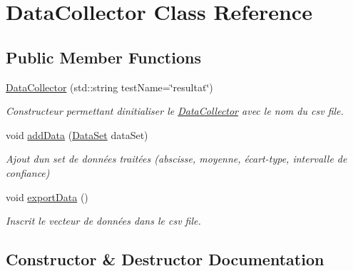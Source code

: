 \hypertarget{classDataCollector}{}\section{Data\+Collector Class Reference}
\label{classDataCollector}
\subsection*{Public Member Functions}
\begin{DoxyCompactItemize}
\item 
\hyperlink{classDataCollector_a8061e46d6301b7a766bd628472353b44}{Data\+Collector} (std\+::string test\+Name=\char`\"{}resultat\char`\"{})
\begin{DoxyCompactList}\small\item\em Constructeur permettant d\textquotesingle{}initialiser le \hyperlink{classDataCollector}{Data\+Collector} avec le nom du csv file. \end{DoxyCompactList}\item 
\mbox{\label{classDataCollector_ac0d50d38e3a5107541f929d4ea3a8cb5}} 
void \hyperlink{classDataCollector_ac0d50d38e3a5107541f929d4ea3a8cb5}{add\+Data} (\hyperlink{classDataSet}{Data\+Set} data\+Set)
\begin{DoxyCompactList}\small\item\em Ajout d\textquotesingle{}un set de données traitées (abscisse, moyenne, écart-\/type, intervalle de confiance) \end{DoxyCompactList}\item 
\mbox{\label{classDataCollector_a6af99e22f24d045d607cb708866b9ce2}} 
void \hyperlink{classDataCollector_a6af99e22f24d045d607cb708866b9ce2}{export\+Data} ()
\begin{DoxyCompactList}\small\item\em Inscrit le vecteur de données dans le csv file. \end{DoxyCompactList}\end{DoxyCompactItemize}


\subsection{Constructor \& Destructor Documentation}
\mbox{\label{classDataCollector_a8061e46d6301b7a766bd628472353b44}} 

